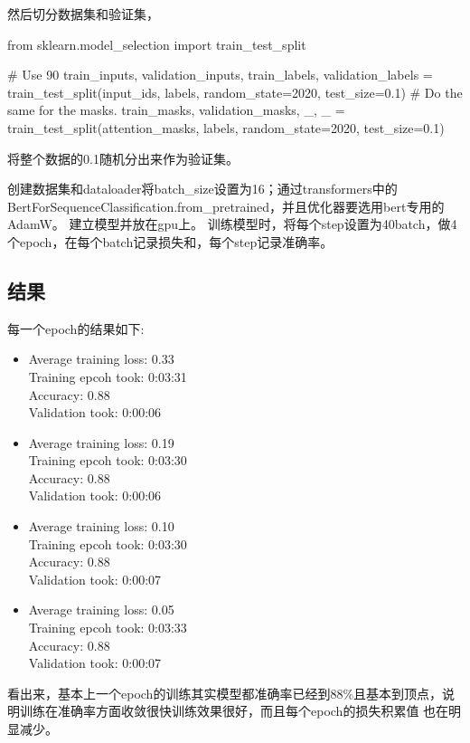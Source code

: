 \documentclass[a4paper,AutoFakeBold,AutoFakeSlant]{ctexart}
\begin{document}
然后切分数据集和验证集，
\begin{python}
from sklearn.model_selection import train_test_split

# Use 90%
train_inputs, validation_inputs, train_labels, validation_labels = train_test_split(input_ids, labels, 
                                            random_state=2020, test_size=0.1)
# Do the same for the masks.
train_masks, validation_masks, _, _ = train_test_split(attention_masks, labels,
                                             random_state=2020, test_size=0.1)
\end{python}
将整个数据的0.1随机分出来作为验证集。

创建数据集和dataloader将batch\_size设置为16；通过transformers中的BertForSequenceClassification.from\_pretrained，并且优化器要选用bert专用的AdamW。
建立模型并放在gpu上。
训练模型时，将每个step设置为40batch，做4个epoch，在每个batch记录损失和，每个step记录准确率。

\subsection{结果}
每一个epoch的结果如下:
\begin{itemize}
  \item  Average training loss: 0.33\\Training epcoh took: 0:03:31\\Accuracy: 0.88\\Validation took: 0:00:06
  \item  Average training loss: 0.19\\Training epcoh took: 0:03:30\\Accuracy: 0.88\\Validation took: 0:00:06
  \item  Average training loss: 0.10\\Training epcoh took: 0:03:30\\Accuracy: 0.88\\Validation took: 0:00:07
  \item  Average training loss: 0.05\\Training epcoh took: 0:03:33\\Accuracy: 0.88\\Validation took: 0:00:07
\end{itemize}
看出来，基本上一个epoch的训练其实模型都准确率已经到88\%且基本到顶点，说明训练在准确率方面收敛很快训练效果很好，而且每个epoch的损失积累值
也在明显减少。
\end{document}
